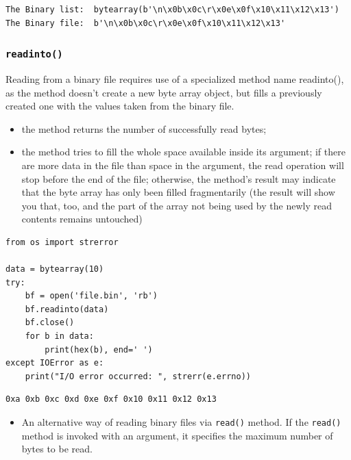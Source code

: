 \documentclass[11pt]{article}
\begin{document}
\begin{verbatim}
The Binary list:  bytearray(b'\n\x0b\x0c\r\x0e\x0f\x10\x11\x12\x13')
The Binary file:  b'\n\x0b\x0c\r\x0e\x0f\x10\x11\x12\x13'
\end{verbatim}

\subsubsection{\texttt{readinto()}}
\label{sec:orgcf1e14c}
Reading from a binary file requires use of a specialized method name
readinto(), as the method doesn’t create a new byte array object, but
fills a previously created one with the values taken from the binary
file.

\begin{itemize}
\item the method returns the number of successfully read bytes;

\item the method tries to fill the whole space available inside its
argument; if there are more data in the file than space in the
argument, the read operation will stop before the end of the file;
otherwise, the method’s result may indicate that the byte array has
only been filled fragmentarily (the result will show you that, too,
and the part of the array not being used by the newly read contents
remains untouched)
\end{itemize}

\begin{verbatim}
from os import strerror

data = bytearray(10)
try:
	bf = open('file.bin', 'rb')
	bf.readinto(data)
	bf.close()
	for b in data:
		print(hex(b), end=' ')
except IOError as e:
	print("I/O error occurred: ", strerr(e.errno))
\end{verbatim}

\begin{verbatim}
0xa 0xb 0xc 0xd 0xe 0xf 0x10 0x11 0x12 0x13 
\end{verbatim}

\vspace{10 mm}

\begin{itemize}
\item An alternative way of reading binary files via \texttt{read()} method. If
the \texttt{read()} method is invoked with an argument, it specifies the
maximum number of bytes to be read.
\end{itemize}
\end{document}
